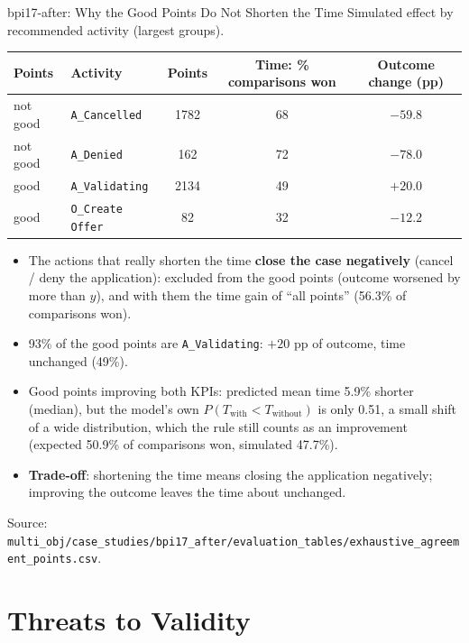 \documentclass[aspectratio=169]{beamer} %
\begin{document}
\begin{frame}{bpi17-after: Why the Good Points Do Not Shorten the Time}
  \footnotesize
  Simulated effect by recommended activity (largest groups).
  \begin{center}\scriptsize
  \begin{tabular}{llccc}
    \toprule
    Points & Activity & Points & Time: \% comparisons won & Outcome change (pp) \\
    \midrule
    not good & \texttt{A\_Cancelled}    & 1782 & 68 & $-59.8$ \\
    not good & \texttt{A\_Denied}       &  162 & 72 & $-78.0$ \\
    good     & \texttt{A\_Validating}   & 2134 & 49 & $+20.0$ \\
    good     & \texttt{O\_Create Offer} &   82 & 32 & $-12.2$ \\
    \bottomrule
  \end{tabular}
  \end{center}
  \scriptsize
  \begin{itemize}
    \item The actions that really shorten the time \textbf{close the case negatively} (cancel / deny the
      application): excluded from the good points (outcome worsened by more than $y$), and with them the time
      gain of ``all points'' (56.3\% of comparisons won).
    \item 93\% of the good points are \texttt{A\_Validating}: $+20$ pp of outcome, time unchanged (49\%).
    \item Good points improving both KPIs: predicted mean time 5.9\% shorter (median), but the model's own
      $P(T_{\text{with}} < T_{\text{without}})$ is only 0.51, a small shift of a wide distribution, which the rule
      still counts as an improvement (expected 50.9\% of comparisons won, simulated 47.7\%).
    \item \textbf{Trade-off}: shortening the time means closing the application negatively; improving the outcome
      leaves the time about unchanged.
  \end{itemize}
  {\scriptsize Source: \texttt{multi\_obj/case\_studies/bpi17\_after/evaluation\_tables/exhaustive\_agreement\_points.csv}.}
\end{frame}
\fi

\section{Threats to Validity}
\end{document}

